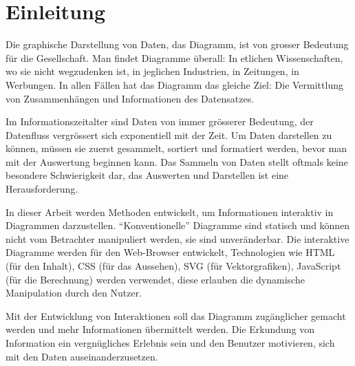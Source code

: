 \chapter{Einleitung}
Die graphische Darstellung von Daten, das Diagramm, ist von grosser Bedeutung für die Gesellschaft. Man findet Diagramme überall: In etlichen Wissenschaften, wo sie nicht wegzudenken ist, in jeglichen Industrien, in Zeitungen, in Werbungen. In allen Fällen hat das Diagramm das gleiche Ziel: Die Vermittlung von Zusammenhängen und Informationen des Datensatzes.

Im Informationszeitalter sind Daten von immer grösserer Bedeutung, der Datenfluss vergrössert sich exponentiell mit der Zeit. Um Daten darstellen zu können, müssen sie zuerst gesammelt, sortiert und formatiert werden, bevor man mit der Auswertung beginnen kann. Das Sammeln von Daten stellt oftmals keine besondere Schwierigkeit dar, das Auswerten und Darstellen ist eine Herausforderung.

In dieser Arbeit werden Methoden entwickelt, um Informationen interaktiv in Diagrammen darzustellen. "`Konventionelle"' Diagramme sind statisch und können nicht vom Betrachter manipuliert werden, sie sind unveränderbar. Die interaktive Diagramme werden für den Web-Browser entwickelt, Technologien wie HTML (für den Inhalt), CSS (für das Aussehen), SVG (für Vektorgrafiken), JavaScript (für die Berechnung) werden verwendet, diese erlauben die dynamische Manipulation durch den Nutzer.

Mit der Entwicklung von Interaktionen soll das Diagramm zugänglicher gemacht werden und mehr Informationen übermittelt werden. Die Erkundung von Information ein vergnügliches Erlebnis sein und den Benutzer motivieren, sich mit den Daten auseinanderzusetzen.